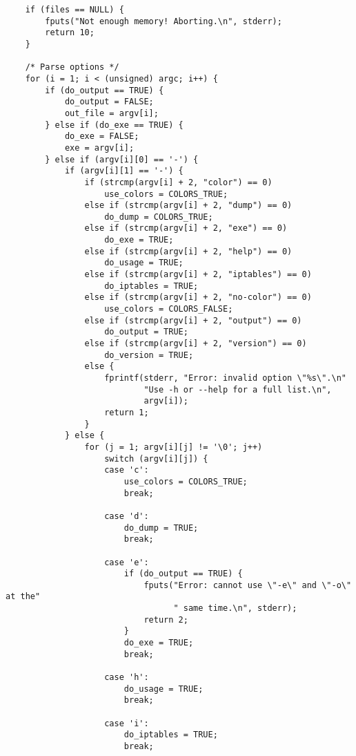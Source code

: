 \documentclass[a4paper,landscape,twocolumn,11pt]{article}
\begin{document}
\begin{lstlisting}
    if (files == NULL) {
        fputs("Not enough memory! Aborting.\n", stderr);
        return 10;
    }

    /* Parse options */
    for (i = 1; i < (unsigned) argc; i++) {
        if (do_output == TRUE) {
            do_output = FALSE;
            out_file = argv[i];
        } else if (do_exe == TRUE) {
            do_exe = FALSE;
            exe = argv[i];
        } else if (argv[i][0] == '-') {
            if (argv[i][1] == '-') {
                if (strcmp(argv[i] + 2, "color") == 0)
                    use_colors = COLORS_TRUE;
                else if (strcmp(argv[i] + 2, "dump") == 0)
                    do_dump = COLORS_TRUE;
                else if (strcmp(argv[i] + 2, "exe") == 0)
                    do_exe = TRUE;
                else if (strcmp(argv[i] + 2, "help") == 0)
                    do_usage = TRUE;
                else if (strcmp(argv[i] + 2, "iptables") == 0)
                    do_iptables = TRUE;
                else if (strcmp(argv[i] + 2, "no-color") == 0)
                    use_colors = COLORS_FALSE;
                else if (strcmp(argv[i] + 2, "output") == 0)
                    do_output = TRUE;
                else if (strcmp(argv[i] + 2, "version") == 0)
                    do_version = TRUE;
                else {
                    fprintf(stderr, "Error: invalid option \"%s\".\n"
                            "Use -h or --help for a full list.\n",
                            argv[i]);
                    return 1;
                }
            } else {
                for (j = 1; argv[i][j] != '\0'; j++)
                    switch (argv[i][j]) {
                    case 'c':
                        use_colors = COLORS_TRUE;
                        break;

                    case 'd':
                        do_dump = TRUE;
                        break;

                    case 'e':
                        if (do_output == TRUE) {
                            fputs("Error: cannot use \"-e\" and \"-o\" at the"
                                  " same time.\n", stderr);
                            return 2;
                        }
                        do_exe = TRUE;
                        break;

                    case 'h':
                        do_usage = TRUE;
                        break;

                    case 'i':
                        do_iptables = TRUE;
                        break;


\end{lstlisting}
\end{document}
